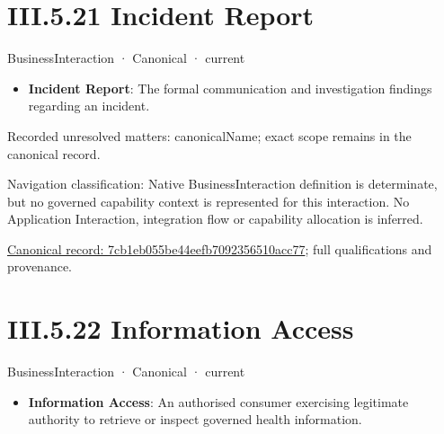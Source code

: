\section*{III.5.21 Incident Report}
\label{navigation:III.5.21}

\label{element:7cb1eb055be44eefb7092356510acc77}
{\small BusinessInteraction · Canonical · current}\par

\begin{itemize}


\item \textbf{Incident Report}: The formal communication and investigation findings regarding an incident.

\end{itemize}

{\small Recorded unresolved matters: canonicalName; exact scope remains in the canonical record.}\par
{\small Navigation classification: Native BusinessInteraction definition is determinate, but no governed capability context is represented for this interaction. No Application Interaction, integration flow or capability allocation is inferred.}\par
{\footnotesize \href{../../../../../../../continuum/business/business-interaction/7cb1eb055be44eefb7092356510acc77.md}{Canonical record: 7cb1eb055be44eefb7092356510acc77}; full qualifications and provenance.}\par
\section*{III.5.22 Information Access}
\label{navigation:III.5.22}

\label{element:b2624626d06044fb9767a96045cd0302}
{\small BusinessInteraction · Canonical · current}\par

\begin{itemize}


\item \textbf{Information Access}: An authorised consumer exercising legitimate authority to retrieve or inspect governed health information.

\end{itemize}

